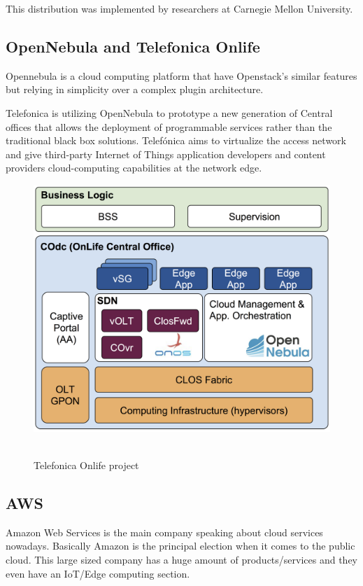 This distribution was implemented by researchers at Carnegie Mellon University.
\newpage
\subsection{OpenNebula and Telefonica Onlife}
\label{makereference2.3.2}

Opennebula is a cloud computing platform that have Openstack's similar features but relying in simplicity over a complex plugin architecture.

Telefonica is utilizing OpenNebula to prototype a new generation of Central offices that allows the deployment of programmable services rather than the traditional black box solutions. Telefónica aims to virtualize the access network and give third-party Internet of Things application developers and content providers cloud-computing capabilities at the network edge.~\cite{IEC:Opennebula:2017}

\begin{figure}[h]%
    \includegraphics[width=6.5in]{figures/opennebula_edge.png}
~\caption{Telefonica Onlife project}
\label{figure2.3}
\end{figure}

\newpage
\subsection{AWS}
\label{makereference2.3.3}

Amazon Web Services is the main company speaking about cloud services nowadays. Basically Amazon is the principal election when it comes to the public cloud.
This large sized company has a huge amount of products/services and they even have an IoT/Edge computing section.

